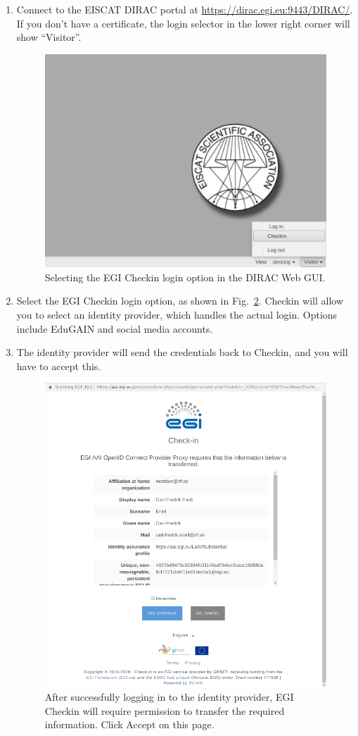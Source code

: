 \documentclass[a4paper]{article}
\begin{document}
\begin{enumerate}
  
\item Connect to the EISCAT DIRAC portal at
  \url{https://dirac.egi.eu:9443/DIRAC/}. If you don't have a
  certificate, the login selector in the lower right corner will show
  ``Visitor''.

\begin{figure}[htb]
  \centering
  \includegraphics[width=0.5\linewidth]{dirac-gui-checkin}
  \caption{Selecting the EGI Checkin login option in the DIRAC Web GUI.}
  \label{fig:checkin}
\end{figure}

  
\item Select the EGI Checkin login option, as shown in Fig.~\ref{fig:checkin}.
Checkin will allow you to select an identity provider, which handles the actual login. Options include EduGAIN and social media accounts.

\item The identity provider will send the credentials back to Checkin,
  and you will have to accept this.

\begin{figure}[htb]
  \centering
  \includegraphics[width=0.5\linewidth]{checkin-accept}
  \caption{After successfully logging in to the identity provider, EGI Checkin will require permission to transfer the required information. Click Accept on this page.}
  \label{fig:checkin}
\end{figure}

\end{enumerate}
\end{document}
